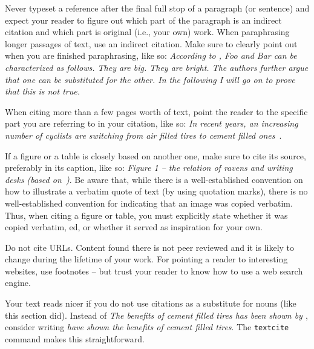 \documentclass[]{ccs-thesis}
\begin{document}
{Never typeset a reference after the final full stop of a paragraph (or sentence) and expect your reader to figure out which part of the paragraph is an indirect citation and which part is original (i.e., your own) work.
When paraphrasing longer passages of text, use an indirect citation.
Make sure to clearly point out when you are finished paraphrasing, like so:
\emph{According to \textcite{akyildiz2002survey}, Foo and Bar can be characterized as follows. They are big. They are bright. The authors further argue that one can be substituted for the other. In the following I will go on to prove that this is not true.}

When citing more than a few pages worth of text, point the reader to the specific part you are referring to in your citation, like so:
\emph{In recent years, an increasing number of cyclists are switching from air filled tires to cement filled ones~\cite[Table IV]{dietrich2009lifetime}}.

If a figure or a table is closely based on another one, make sure to cite its source, preferably in its caption, like so:
\emph{Figure 1 -- the relation of ravens and writing desks (based on~\cite[Figure~42]{dietrich2009lifetime})}.
Be aware that, while there is a well-established convention on how to illustrate a verbatim quote of text (by using quotation marks), there is no well-established convention for indicating that an image was copied verbatim.
Thus, when citing a figure or table, you must explicitly state whether it was copied verbatim, ed, or whether it served as inspiration for your own.

Do not cite URLs. Content found there is not peer reviewed and it is likely to change during the lifetime of your work.
For pointing a reader to interesting websites, use footnotes -- but trust your reader to know how to use a web search engine.

Your text reads nicer if you do not use citations as a substitute for nouns (like this section did).
Instead of \emph{The benefits of cement filled tires has been shown by \cite{akyildiz2002survey}}, consider writing \emph{\textcite{akyildiz2002survey} have shown the benefits of cement filled tires}.
The \texttt{textcite} command makes this straightforward.

}
\end{document}
